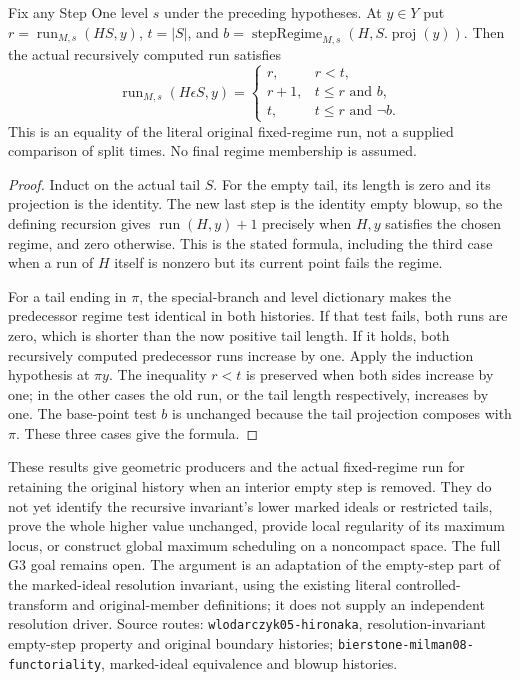 \begin{lemma}
\label{hir:original-interior-empty-regime-run}
\leanok
{}
Fix any Step One level $s$ under the preceding hypotheses.  At $y\in Y$ put
$r=\operatorname{run}_{M,s}(HS,y)$, $t=|S|$, and
$b=\operatorname{stepRegime}_{M,s}(H,S.\operatorname{proj}(y))$.
Then the actual recursively computed run satisfies
\[
 \operatorname{run}_{M,s}(H\epsilon S,y)=
 \begin{cases}
 r,&r<t,\\
 r+1,&t\le r\text{ and }b,\\
 t,&t\le r\text{ and }\neg b.
 \end{cases}
\]
This is an equality of the literal original fixed-regime run, not a supplied
comparison of split times.  No final regime membership is assumed.
\end{lemma}
\begin{proof}
Induct on the actual tail $S$.  For the empty tail, its length is zero and its
projection is the identity.  The new last step is the identity empty blowup,
so the defining recursion gives $\operatorname{run}(H,y)+1$ precisely when
$H,y$ satisfies the chosen regime, and zero otherwise.  This is the stated
formula, including the third case when a run of $H$ itself is nonzero but its
current point fails the regime.

For a tail ending in $\pi$, the special-branch and level dictionary makes the
predecessor regime test identical in both histories.  If that test fails,
both runs are zero, which is shorter than the now positive tail length.
If it holds, both recursively computed predecessor runs increase by one.
Apply the induction hypothesis at $\pi y$.  The inequality $r<t$ is preserved
when both sides increase by one; in the other cases the old run, or the tail
length respectively, increases by one.  The base-point test $b$ is unchanged
because the tail projection composes with $\pi$.  These three cases give the
formula.
\end{proof}

These results give geometric producers and the actual fixed-regime run for retaining the original history when
an interior empty step is removed.  They do not yet identify the recursive
invariant's lower marked ideals or restricted tails, prove the whole higher value
unchanged, provide local regularity of its maximum locus, or construct global
maximum scheduling on a noncompact space.  The full G3 goal remains open.
The argument is an adaptation of the empty-step part of the marked-ideal
resolution invariant, using the existing literal controlled-transform and
original-member definitions; it does not supply an independent resolution
driver.  Source routes: \texttt{wlodarczyk05-hironaka}, resolution-invariant
empty-step property and original boundary histories; \texttt{bierstone-milman08-functoriality},
marked-ideal equivalence and blowup histories.
